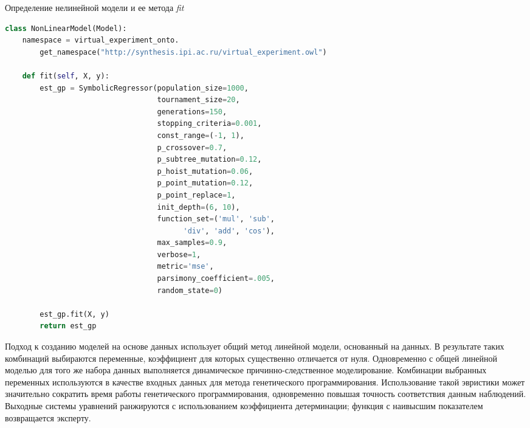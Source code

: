 \begin{ListingEnv}[!h]%
    \captiondelim{ } %
    \caption{Определение нелинейной модели и ее метода \textit{fit}}\label{lst:fit}
    \begin{lstlisting}[language={Python}]
class NonLinearModel(Model):
    namespace = virtual_experiment_onto.
        get_namespace("http://synthesis.ipi.ac.ru/virtual_experiment.owl")

    def fit(self, X, y):
        est_gp = SymbolicRegressor(population_size=1000,
                                   tournament_size=20,
                                   generations=150, 
                                   stopping_criteria=0.001,
                                   const_range=(-1, 1),
                                   p_crossover=0.7, 
                                   p_subtree_mutation=0.12,
                                   p_hoist_mutation=0.06, 
                                   p_point_mutation=0.12,
                                   p_point_replace=1,
                                   init_depth=(6, 10),
                                   function_set=('mul', 'sub', 
                                         'div', 'add', 'cos'),
                                   max_samples=0.9,
                                   verbose=1,
                                   metric='mse',
                                   parsimony_coefficient=.005,
                                   random_state=0)

        est_gp.fit(X, y)
        return est_gp
\end{lstlisting}
\end{ListingEnv}

Подход к созданию моделей на основе данных использует общий метод линейной модели, основанный на данных. В результате таких комбинаций выбираются переменные, коэффициент для которых существенно отличается от нуля. Одновременно с общей линейной моделью для того же набора данных выполняется динамическое причинно-следственное моделирование. Комбинации выбранных переменных используются в качестве входных данных для метода генетического программирования. Использование такой эвристики может значительно сократить время работы генетического программирования, одновременно повышая точность соответствия данным наблюдений. Выходные системы уравнений ранжируются с использованием коэффициента детерминации; функция с наивысшим показателем возвращается эксперту.

